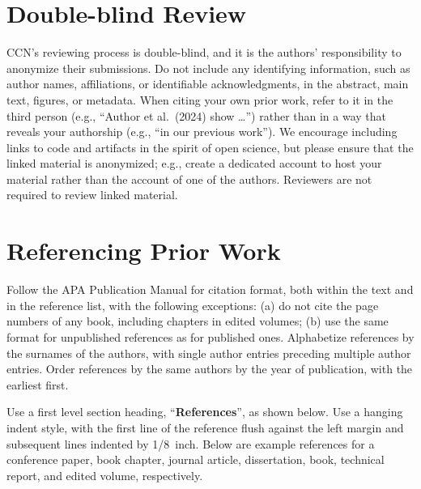 \documentclass{ccn}  %
\begin{document}
\section{Double-blind Review}

CCN's reviewing process is double-blind, and it is the authors' responsibility to
anonymize their submissions.
Do not include any identifying information, such as author names, affiliations, or
identifiable acknowledgments, in the abstract, main text, figures, or metadata.
When citing your own prior work, refer to it in the third person
(e.g., ``Author et al.\ (2024) show \ldots'') rather than in a way that reveals
your authorship (e.g., ``in our previous work'').
We encourage including links to code and artifacts in the spirit of open science, but
please ensure that the linked material is anonymized; e.g., create a dedicated account
to host your material rather than the account of one of the authors.
Reviewers are not required to review linked material.

\section{Referencing Prior Work}

Follow the APA Publication Manual for citation format, both within the text and in the
reference list, with the following exceptions: (a) do not cite the page numbers of any
book, including chapters in edited volumes; (b) use the same format for unpublished
references as for published ones.
Alphabetize references by the surnames of the authors, with single author entries
preceding multiple author entries.
Order references by the same authors by the year of publication, with the earliest
first.

Use a first level section heading, ``{\bf References}'', as shown below.
Use a hanging indent style, with the first line of the reference flush against the left
margin and subsequent lines indented by 1/8~inch.
Below are example references for a conference paper, book chapter, journal article,
dissertation, book, technical report, and edited volume, respectively.

\nocite{ChalnickBillman1988a}
\nocite{Feigenbaum1963a}
\nocite{Hill1983a}
\nocite{OhlssonLangley1985a}
\nocite{Matlock2001}
\nocite{NewellSimon1972a}
\nocite{ShragerLangley1990a}

\printbibliography
\end{document}

